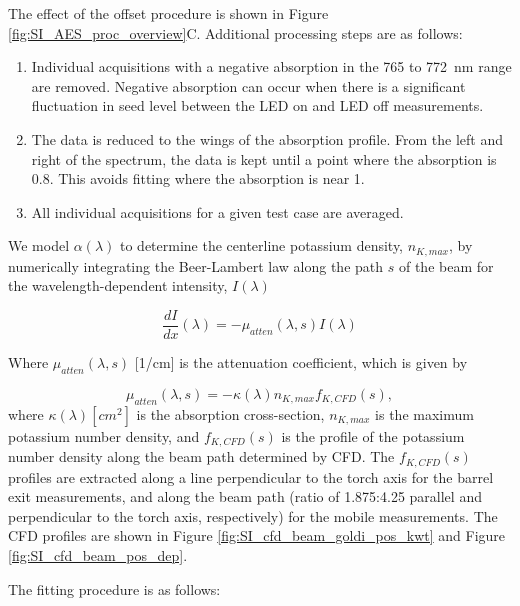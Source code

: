 The effect of the offset procedure is shown in Figure \ref{fig:SI_AES_proc_overview}C. Additional processing steps are as follows:

\begin{enumerate}
    \item Individual acquisitions with a negative absorption in the 765 to \SI{772} {\nano\meter} range are removed. Negative absorption can occur when there is a significant fluctuation in seed level between the LED on and LED off measurements.
    \item The data is reduced to the wings of the absorption profile. From the left and right of the spectrum, the data is kept until a point where the absorption is 0.8. This avoids fitting where the absorption is near 1. 
    \item All individual acquisitions for a given test case are averaged.
\end{enumerate}
We model $\alpha(\lambda)$ to determine the centerline potassium density, $n_{K,max}$, by numerically integrating the Beer-Lambert law along the path $s$ of the beam for the wavelength-dependent intensity, $I(\lambda)$

\begin{equation}
    \frac{dI}{dx}(\lambda) = -\mu_{atten}(\lambda, s) I(\lambda)
\end{equation}

Where $\mu_{atten} (\lambda, s)$ [1/cm] is the attenuation coefficient, which is given by 

\begin{equation}
    \mu_{atten}(\lambda, s) = -\kappa(\lambda) n_{K,max} f_{K, CFD}(s),
\end{equation}
where $\kappa(\lambda) [cm^2]$ is the absorption cross-section, $n_{K,max}$ is the maximum potassium number density, and $f_{K, CFD}(s)$ is the profile of the potassium number density along the beam path determined by CFD. The $f_{K, CFD}(s)$ profiles are extracted along a line perpendicular to the torch axis for the barrel exit measurements, and along the beam path (ratio of 1.875:4.25 parallel and perpendicular to the torch axis, respectively) for the mobile measurements. The CFD profiles are shown in Figure \ref{fig:SI_cfd_beam_goldi_pos_kwt} and Figure \ref{fig:SI_cfd_beam_pos_dep}.

The fitting procedure is as follows:


